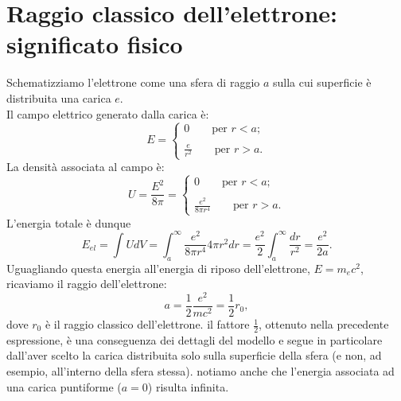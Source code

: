 \section[Raggio classico dell'elettrone]{Raggio classico dell'elettrone: significato fisico}
Schematizziamo l'elettrone come una sfera di raggio $a$ sulla cui superficie è distribuita una carica $e$.\\
Il campo elettrico generato dalla carica è:
\begin{equation}
E=\begin{cases}
0 \qquad \textrm{per }r<a;\\
\\
\displaystyle{\frac{e}{r^2}} \qquad \textrm{per }r>a.
\end{cases}
\end{equation}
La densità associata al campo è:
\begin{equation}
U=\frac{E^2}{8\pi}=\begin{cases}
0 \qquad \textrm{per }r<a;\\
\\
\displaystyle{\frac{e^2}{8\pi r^4}} \qquad \textrm{per }r>a.
\end{cases}
\end{equation}
L'energia totale è dunque
\begin{equation}
E_{el}=\int U dV = \int _a ^{\infty} \frac{e^2}{8\pi r^4} 4\pi r^2 dr = \frac{e^2}{2} \int _a ^{\infty} \frac{dr}{r^2}=\frac{e^2}{2a}. 
\end{equation}
Uguagliando questa energia all'energia di riposo dell'elettrone, $E=m_e c^2$, ricaviamo il raggio dell'elettrone:
\begin{equation}
a=\frac{1}{2}\frac{e^2}{mc^2}=\frac{1}{2} r_0,
\end{equation}
dove $r_0$ è il raggio classico dell'elettrone. il fattore $\frac{1}{2}$, ottenuto nella precedente espressione, è una conseguenza dei dettagli del modello e segue in particolare dall'aver scelto la carica distribuita solo sulla superficie della sfera (e non, ad esempio, all'interno della sfera stessa). notiamo anche che l'energia associata ad una carica puntiforme ($a=0$) risulta infinita.
